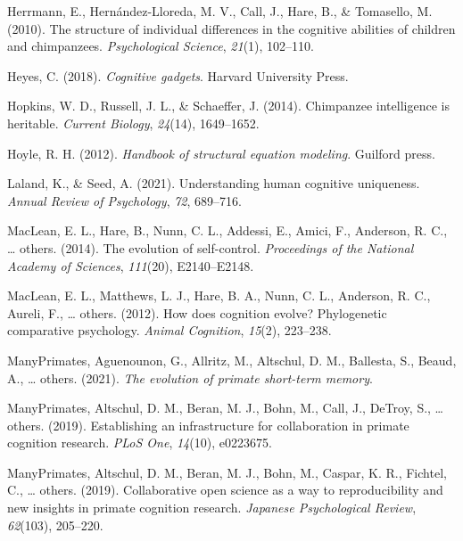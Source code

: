 \documentclass[
  man,floatsintext]{apa6}
\newlength{\cslhangindent}
\newlength{\cslentryspacingunit} %
\newenvironment{CSLReferences}[2] %
 {%
  \setlength{\parindent}{0pt}
  \ifodd #1
  \let\oldpar\par
  \def\par{\hangindent=\cslhangindent\oldpar}
  \fi
  \setlength{\parskip}{#2\cslentryspacingunit}
 }%
 {}
\begin{document}
\begin{CSLReferences}{1}{0}
\leavevmode{}%
Herrmann, E., Hernández-Lloreda, M. V., Call, J., Hare, B., \& Tomasello, M. (2010). The structure of individual differences in the cognitive abilities of children and chimpanzees. \emph{Psychological Science}, \emph{21}(1), 102--110.

\leavevmode{}%
Heyes, C. (2018). \emph{Cognitive gadgets}. Harvard University Press.

\leavevmode{}%
Hopkins, W. D., Russell, J. L., \& Schaeffer, J. (2014). Chimpanzee intelligence is heritable. \emph{Current Biology}, \emph{24}(14), 1649--1652.

\leavevmode{}%
Hoyle, R. H. (2012). \emph{Handbook of structural equation modeling}. Guilford press.

\leavevmode{}%
Laland, K., \& Seed, A. (2021). Understanding human cognitive uniqueness. \emph{Annual Review of Psychology}, \emph{72}, 689--716.

\leavevmode{}%
MacLean, E. L., Hare, B., Nunn, C. L., Addessi, E., Amici, F., Anderson, R. C., \ldots{} others. (2014). The evolution of self-control. \emph{Proceedings of the National Academy of Sciences}, \emph{111}(20), E2140--E2148.

\leavevmode{}%
MacLean, E. L., Matthews, L. J., Hare, B. A., Nunn, C. L., Anderson, R. C., Aureli, F., \ldots{} others. (2012). How does cognition evolve? Phylogenetic comparative psychology. \emph{Animal Cognition}, \emph{15}(2), 223--238.

\leavevmode{}%
ManyPrimates, Aguenounon, G., Allritz, M., Altschul, D. M., Ballesta, S., Beaud, A., \ldots{} others. (2021). \emph{The evolution of primate short-term memory}.

\leavevmode{}%
ManyPrimates, Altschul, D. M., Beran, M. J., Bohn, M., Call, J., DeTroy, S., \ldots{} others. (2019). Establishing an infrastructure for collaboration in primate cognition research. \emph{PLoS One}, \emph{14}(10), e0223675.

\leavevmode{}%
ManyPrimates, Altschul, D. M., Beran, M. J., Bohn, M., Caspar, K. R., Fichtel, C., \ldots{} others. (2019). Collaborative open science as a way to reproducibility and new insights in primate cognition research. \emph{Japanese Psychological Review}, \emph{62}(103), 205--220.


\end{CSLReferences}
\end{document}
